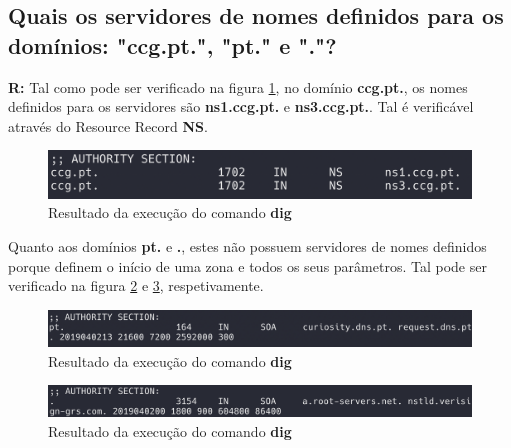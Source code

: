 \documentclass{llncs}
\begin{document}
\subsection{\textbf{Quais os servidores de nomes definidos para os domínios: "ccg.pt.", "pt." e "."?}}
\textbf{R:} Tal como pode ser verificado na figura \ref{fig:1c1}, no domínio \textbf{ccg.pt.}, os nomes definidos para os servidores são \textbf{ns1.ccg.pt.} e \textbf{ns3.ccg.pt.}. Tal é verificável através do Resource Record \textbf{NS}.

\begin{figure}[H]
\begin{center}
\includegraphics[scale=0.4]{1c1.png}
\end{center}
\caption{\label{fig:1c1}Resultado da execução do comando \textbf{dig}}
\end{figure}

Quanto aos domínios \textbf{pt.} e \textbf{.}, estes não possuem servidores de nomes definidos porque definem o início de uma zona e todos os seus parâmetros. Tal pode ser verificado na figura \ref{fig:1c2} e \ref{fig:1c3}, respetivamente.

\begin{figure}[H]
\begin{center}
\includegraphics[scale=0.4]{1c2.png}
\end{center}
\caption{\label{fig:1c2}Resultado da execução do comando \textbf{dig}}
\end{figure}

\begin{figure}[H]
\begin{center}
\includegraphics[scale=0.4]{1c3.png}
\end{center}
\caption{\label{fig:1c3}Resultado da execução do comando \textbf{dig}}
\end{figure}
\end{document}
